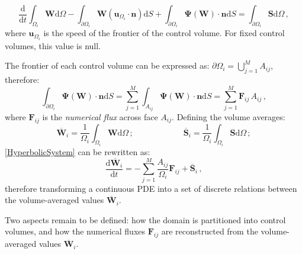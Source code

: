 \documentclass[11pt, a4paper, oneside, openany]{book}
\begin{document}
\begin{equation}
\dfrac{\mathrm{d}}{\mathrm{d}t}\int_{\Omega_{i}}\boldsymbol{W}\mathrm{d}\Omega-\int_{\partial\Omega_{i}}\boldsymbol{W}\left(\boldsymbol{u}_{\Omega_{i}}\cdot\boldsymbol{n}\right)\mathrm{d}S+\int_{\partial\Omega_{i}}\boldsymbol{\Psi}\left(\boldsymbol{W}\right)\cdot\boldsymbol{n}\mathrm{d}S=\int_{\partial\Omega_{i}}\boldsymbol{S}\mathrm{d}\Omega\,,
\end{equation}
where $\boldsymbol{u}_{\Omega_{i}}$ is the speed of the frontier of the control volume. For fixed control volumes, this value is null.\par
The frontier of each control volume can be expressed as: $\partial\Omega_{i}=\bigcup_{j=1}^{M}A_{ij}$, therefore:
\begin{equation*}
\int_{\partial\Omega_{i}}\boldsymbol{\Psi}\left(\boldsymbol{W}\right)\cdot\boldsymbol{n}\mathrm{d}S=\sum_{j=1}^{M}\int_{A_{ij}}\boldsymbol{\Psi}\left(\boldsymbol{W}\right)\cdot\boldsymbol{n}\mathrm{d}S=\sum_{j=1}^{M}\boldsymbol{F}_{ij}\,A_{ij}\,,
\end{equation*}
where $\boldsymbol{F}_{ij}$ is the \textit{numerical flux} across face $A_{ij}$. Defining the volume averages:
\begin{equation*}
\boldsymbol{\overline{W}}_{i}=\dfrac{1}{\Omega_i}\int_{\Omega_{i}}\boldsymbol{W}\mathrm{d}\Omega\,;\qquad\qquad\qquad\boldsymbol{\overline{S}}_{i}=\dfrac{1}{\Omega_i}\int_{\Omega_{i}}\boldsymbol{S}\mathrm{d}\Omega\,;
\end{equation*}
\eqref{HyperbolicSystem} 
can be rewritten as:
\begin{equation}
\dfrac{\mathrm{d}\boldsymbol{\overline{W}}_{i}}{\mathrm{d}t}=-\sum_{j=1}^{M}\dfrac{A_{ij}}{\Omega_{i}}\boldsymbol{F}_{ij}+\boldsymbol{\overline{S}}_{i}\,,\label{HyperbolicCVDiscrete}
\end{equation}
therefore transforming a continuous PDE into a set of discrete relations between the volume-averaged values $\overline{\boldsymbol{W}}_{i}$.\par
Two aspects remain to be defined: how the domain is partitioned into control volumes, and how the numerical fluxes $\boldsymbol{F}_{ij}$ are reconstructed from the volume-averaged values $\overline{\boldsymbol{W}}_{i}$.
\end{document}
